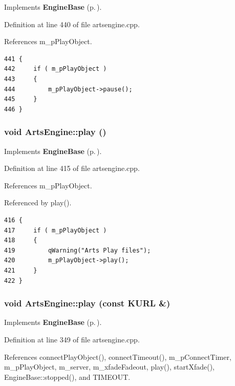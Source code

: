Implements {\bf Engine\-Base} {\rm (p.\,\pageref{classEngineBase_EngineBasei3})}.

Definition at line 440 of file artsengine.cpp.

References m\_\-p\-Play\-Object.



\footnotesize\begin{verbatim}441 {
442     if ( m_pPlayObject )
443     {
444         m_pPlayObject->pause();
445     }
446 }
\end{verbatim}\normalsize 
{}
\subsubsection{\setlength{\rightskip}{0pt plus 5cm}void Arts\-Engine::play ()\hspace{0.3cm}{\tt  [virtual, slot]}}\label{classArtsEngine_ArtsEnginei1}




Implements {\bf Engine\-Base} {\rm (p.\,\pageref{classEngineBase_EngineBasei1})}.

Definition at line 415 of file artsengine.cpp.

References m\_\-p\-Play\-Object.

Referenced by play().



\footnotesize\begin{verbatim}416 {
417     if ( m_pPlayObject )
418     {   
419         qWarning("Arts Play files");  
420         m_pPlayObject->play();
421     }
422 }
\end{verbatim}\normalsize 
{}
\subsubsection{\setlength{\rightskip}{0pt plus 5cm}void Arts\-Engine::play (const KURL \&)\hspace{0.3cm}{\tt  [virtual, slot]}}\label{classArtsEngine_ArtsEnginei0}




Implements {\bf Engine\-Base} {\rm (p.\,\pageref{classEngineBase_EngineBasei0})}.

Definition at line 349 of file artsengine.cpp.

References connect\-Play\-Object(), connect\-Timeout(), m\_\-p\-Connect\-Timer, m\_\-p\-Play\-Object, m\_\-server, m\_\-xfade\-Fadeout, play(), start\-Xfade(), Engine\-Base::stopped(), and TIMEOUT.



